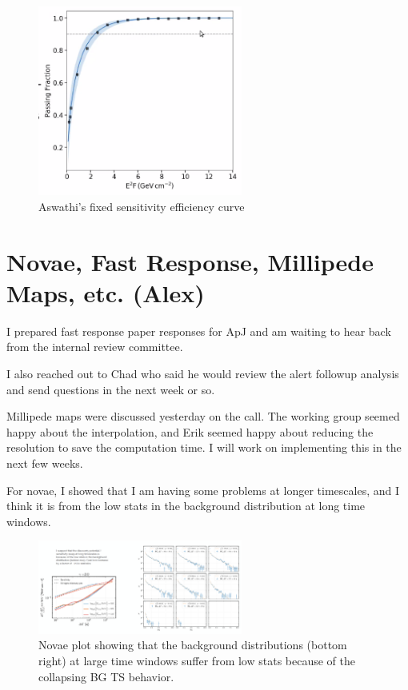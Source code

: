 \begin{figure}[h]
    \centering
    \includegraphics[width=0.6\textwidth]{images/aswathi_plot_011221.png}
    \caption{Aswathi's fixed sensitivity efficiency curve}
    \label{fig:my_label}
\end{figure}

\section{Novae, Fast Response, Millipede Maps, etc. (Alex)}

I prepared fast response paper responses for ApJ and am waiting to hear back from the internal review committee.

I also reached out to Chad who said he would review the alert followup analysis and send questions in the next week or so.

Millipede maps were discussed yesterday on the call. The working group seemed happy about the interpolation, and Erik seemed happy about reducing the resolution to save the computation time. I will work on implementing this in the next few weeks.

For novae, I showed that I am having some problems at longer timescales, and I think it is from the low stats in the background distribution at long time windows. 

\begin{figure}[h]
    \centering
    \includegraphics[width=0.6\textwidth]{images/alex_plot_011221.png}
    \caption{Novae plot showing that the background distributions (bottom right) at large time windows suffer from low stats because of the collapsing BG TS behavior.}
    \label{fig:my_label}
\end{figure}

